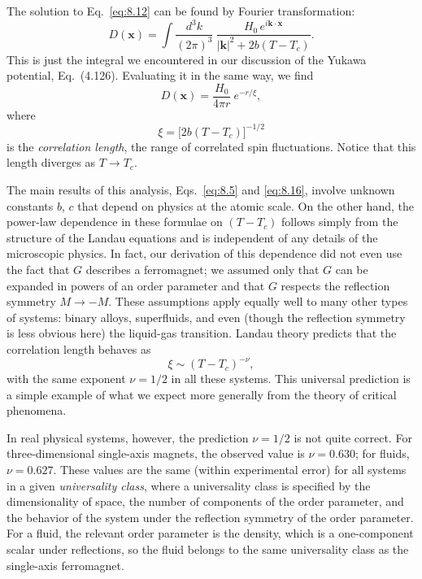 The solution to Eq.~\eqref{eq:8.12} can be found by Fourier transformation:
\begin{equation}
  D(\mathbf{x}) = \int \frac{d^3k}{(2\pi)^3}\
    \frac{H_0\,e^{i\mathbf{k}\cdot\mathbf{x}}}{|\mathbf{k}|^2
      + 2b(T-T_c)} .
  \label{eq:8.14}
\end{equation}
This is just the integral we encountered in our discussion of the Yukawa
potential, Eq.~(4.126).  Evaluating it in the same way, we find
\begin{equation}
  D(\mathbf{x}) = \frac{H_0}{4\pi r}\ e^{-r/\xi},
  \label{eq:8.15}
\end{equation}
where
\begin{equation}
  \xi = \bigl[ 2b(T-T_c) \bigr]^{-1/2}
  \label{eq:8.16}
\end{equation}
is the \emph{correlation length}, the range of correlated spin fluctuations.
Notice that this length diverges as $T\to T_c$.

The main results of this analysis, Eqs.~\eqref{eq:8.5} and \eqref{eq:8.16},
involve unknown constants $b$, $c$ that depend on physics at the atomic scale.
On the other hand, the power-law dependence in these formulae on
$(T-T_c)$ follows simply from the structure of the Landau equations and is
independent of any details of the microscopic physics.  In fact, our
derivation of this dependence did not even use the fact that $G$ describes a
ferromagnet; we assumed only that $G$ can be expanded in powers of an order
parameter and that $G$ respects the reflection symmetry $M\to-M$.  These
assumptions apply equally well to many other types of systems: binary alloys,
superfluids, and even (though the reflection symmetry is less obvious here)
the liquid-gas transition.  Landau theory predicts that the correlation
length behaves as
\begin{equation}
  \xi \sim (T-T_c)^{-\nu},
  \label{eq:8.17}
\end{equation}
with the same exponent $\nu = 1/2$ in all these systems.  This universal
prediction is a simple example of what we expect more generally from the
theory of critical phenomena.

In real physical systems, however, the prediction $\nu = 1/2$ is not quite
correct.  For three-dimensional single-axis magnets, the observed value is
$\nu = 0.630$; for fluids, $\nu = 0.627$.  These values are the same (within
experimental error) for all systems in a given \emph{universality class},
where a universality class is specified by the dimensionality of space, the
number of components of the order parameter, and the behavior of the system
under the reflection symmetry of the order parameter.  For a fluid, the
relevant order parameter is the density, which is a one-component scalar
under reflections, so the fluid belongs to the same universality class as the
single-axis ferromagnet.

